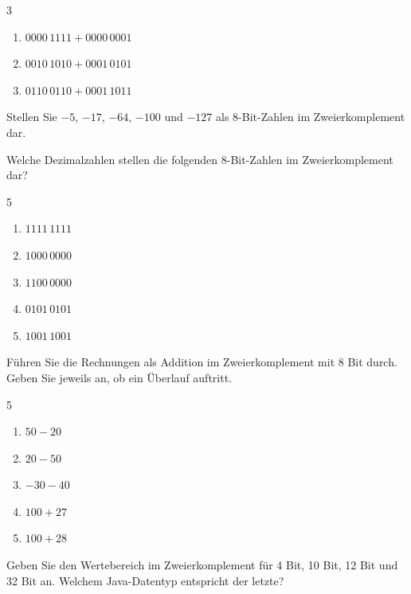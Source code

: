 \ueben
{}
\begin{multicols}{3}
\begin{enumerate}[label=\alph*)]
\item $0000\,1111 + 0000\,0001$
\item $0010\,1010 + 0001\,0101$
\item $0110\,0110 + 0001\,1011$
\end{enumerate}
\end{multicols}

Stellen Sie $-5$, $-17$, $-64$, $-100$ und $-127$ als 8-Bit-Zahlen im Zweierkomplement dar.

Welche Dezimalzahlen stellen die folgenden 8-Bit-Zahlen im Zweierkomplement dar?
\begin{multicols}{5}
\begin{enumerate}[label=\alph*)]
\item $1111\,1111$
\item $1000\,0000$
\item $1100\,0000$
\item $0101\,0101$
\item $1001\,1001$
\end{enumerate}
\end{multicols}

Führen Sie die Rechnungen als Addition im Zweierkomplement mit 8 Bit durch. Geben Sie jeweils an, ob ein Überlauf auftritt.
\begin{multicols}{5}
\begin{enumerate}[label=\alph*)]
\item $50 - 20$
\item $20 - 50$
\item $-30 - 40$
\item $100 + 27$
\item $100 + 28$
\end{enumerate}
\end{multicols}

Geben Sie den Wertebereich im Zweierkomplement für 4 Bit, 10 Bit, 12 Bit und 32 Bit an. Welchem Java-Datentyp entspricht der letzte?
